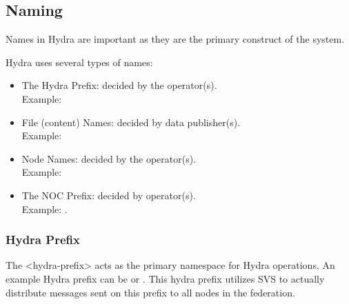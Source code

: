 \subsection{Naming} \label{sec:naming}
Names in Hydra are important as they are the primary construct of the system.


Hydra uses several types of names:
\begin{itemize}
    \item The Hydra Prefix: decided by the operator(s).\\ Example: 
    \item File (content) Names: decided by data publisher(s). \\Example: 
    \item Node Names: decided by the operator(s).\\ Example: 
    \item The NOC Prefix: decided by operator(s).\\ Example: .
\end{itemize}





\subsubsection{Hydra Prefix}
The <hydra-prefix> acts as the primary namespace for Hydra operations. An example Hydra prefix can be  or . 
This hydra prefix utilizes SVS to actually distribute messages sent on this prefix to all nodes in the federation. %

